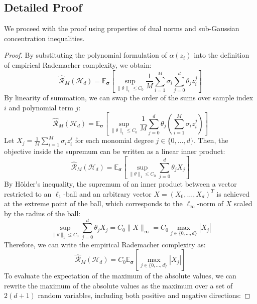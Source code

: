 \documentclass{article}
\theoremstyle{plain}
\theoremstyle{definition}
\theoremstyle{remark}
\begin{document}
\subsection{Detailed Proof}
We proceed with the proof using properties of dual norms and sub-Gaussian concentration inequalities.

\begin{proof}
By substituting the polynomial formulation of $\alpha(z_i)$ into the definition of empirical Rademacher complexity, we obtain:
\begin{equation}
\widehat{\mathcal{R}}_M(\mathcal{H}_d) = \mathbb{E}_{\boldsymbol{\sigma}} \left[ \sup_{\|\theta\|_1 \le C_0} \frac{1}{M} \sum_{i=1}^M \sigma_i \sum_{j=0}^d \theta_j z_i^j \right]
\end{equation}
By linearity of summation, we can swap the order of the sums over sample index $i$ and polynomial term $j$:
\begin{equation}
\widehat{\mathcal{R}}_M(\mathcal{H}_d) = \mathbb{E}_{\boldsymbol{\sigma}} \left[ \sup_{\|\theta\|_1 \le C_0} \frac{1}{M} \sum_{j=0}^d \theta_j \left( \sum_{i=1}^M \sigma_i z_i^j \right) \right]
\end{equation}
Let $X_j = \frac{1}{M} \sum_{i=1}^M \sigma_i z_i^j$ for each monomial degree $j \in \{0, \dots, d\}$. Then, the objective inside the supremum can be written as a linear inner product:
\begin{equation}
\widehat{\mathcal{R}}_M(\mathcal{H}_d) = \mathbb{E}_{\boldsymbol{\sigma}} \left[ \sup_{\|\theta\|_1 \le C_0} \sum_{j=0}^d \theta_j X_j \right]
\end{equation}
By H{\"o}lder's inequality, the supremum of an inner product between a vector restricted to an $\ell_1$-ball and an arbitrary vector $X = (X_0, \dots, X_d)^T$ is achieved at the extreme point of the ball, which corresponds to the $\ell_\infty$-norm of $X$ scaled by the radius of the ball:
\begin{equation}
\sup_{\|\theta\|_1 \le C_0} \sum_{j=0}^d \theta_j X_j = C_0 \|X\|_\infty = C_0 \max_{j \in \{0, \dots, d\}} |X_j|
\end{equation}
Therefore, we can write the empirical Rademacher complexity as:
\begin{equation}
\widehat{\mathcal{R}}_M(\mathcal{H}_d) = C_0 \mathbb{E}_{\boldsymbol{\sigma}} \left[ \max_{j \in \{0, \dots, d\}} |X_j| \right]
\end{equation}
To evaluate the expectation of the maximum of the absolute values, we can rewrite the maximum of the absolute values as the maximum over a set of $2(d+1)$ random variables, including both positive and negative directions:

\end{proof}
\end{document}
